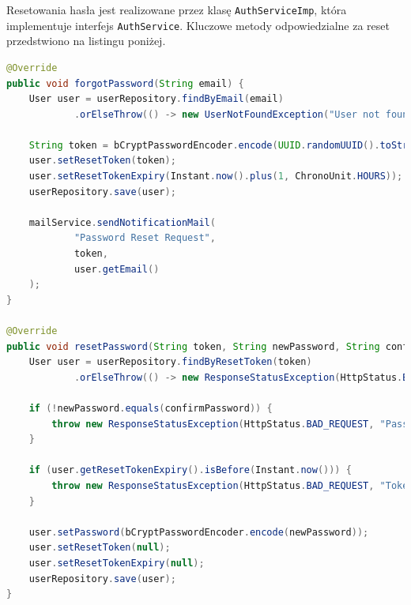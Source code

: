 Resetowania hasła jest realizowane przez klasę \texttt{AuthServiceImp}, która implementuje interfejs \texttt{AuthService}. Kluczowe metody odpowiedzialne za reset przedstwiono na listingu poniżej.
\begin{lstlisting}[language=Java, style=JavaStyle, caption=Metody resetowania hasła w klasie \texttt{AuthServiceImp}]
@Override
public void forgotPassword(String email) {
    User user = userRepository.findByEmail(email)
            .orElseThrow(() -> new UserNotFoundException("User not found"));

    String token = bCryptPasswordEncoder.encode(UUID.randomUUID().toString());
    user.setResetToken(token);
    user.setResetTokenExpiry(Instant.now().plus(1, ChronoUnit.HOURS));
    userRepository.save(user);

    mailService.sendNotificationMail(
            "Password Reset Request",
            token,
            user.getEmail()
    );
}

@Override
public void resetPassword(String token, String newPassword, String confirmPassword) {
    User user = userRepository.findByResetToken(token)
            .orElseThrow(() -> new ResponseStatusException(HttpStatus.BAD_REQUEST, "Invalid token"));

    if (!newPassword.equals(confirmPassword)) {
        throw new ResponseStatusException(HttpStatus.BAD_REQUEST, "Passwords do not match");
    }

    if (user.getResetTokenExpiry().isBefore(Instant.now())) {
        throw new ResponseStatusException(HttpStatus.BAD_REQUEST, "Token has expired");
    }

    user.setPassword(bCryptPasswordEncoder.encode(newPassword));
    user.setResetToken(null);
    user.setResetTokenExpiry(null);
    userRepository.save(user);
}
\end{lstlisting}

